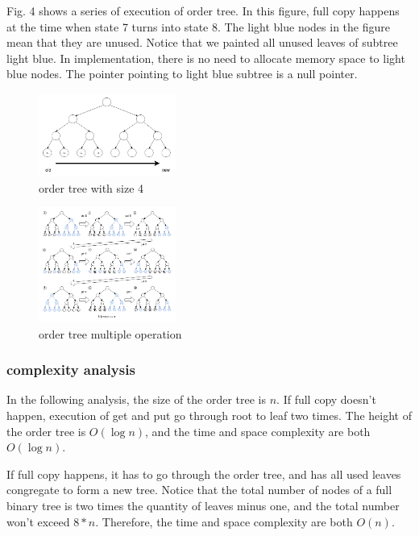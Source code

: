 \documentclass[conference]{IEEEtran}
\begin{document}
Fig. 4 shows a series of execution of order tree. In this figure, full copy happens at the time when state 7 turns into state 8. The light blue nodes in the figure mean that they are unused. Notice that we painted all unused leaves of subtree light blue.
In implementation, there is no need to allocate memory space to light blue nodes. The pointer pointing to light blue subtree is a null pointer.

\begin{figure}
  \centering
  \includegraphics[width=0.4\textwidth]{../images/order-tree}
  \caption{order tree with size 4}
\end{figure}

\begin{figure}
  \centering
  \includegraphics[width=0.4\textwidth]{../images/order-trees}
  \caption{order tree multiple operation}
\end{figure}

\subsubsection{complexity analysis}
In the following analysis, the size of the order tree is $n$.
If full copy doesn’t happen, execution of get and put go through root to leaf two times.
The height of the order tree is $O(\log n)$, and the time and space complexity are both $O(\log n)$.  

If full copy happens, it has to go through the order tree,
and has all used leaves congregate to form a new tree.
Notice that the total number of nodes of a full binary tree is two times the quantity of leaves minus one,
and the total number won’t exceed $8*n$.
Therefore, the time and space complexity are both $O(n)$.
\end{document}
